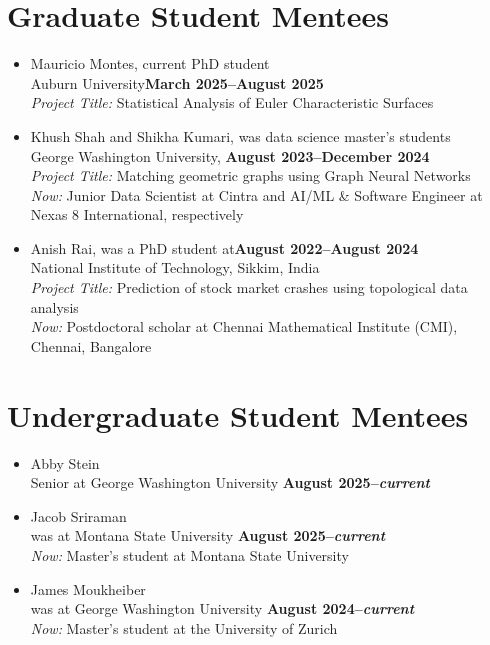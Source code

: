 \documentclass[11pt]{article}
\begin{document}
\section{Graduate Student Mentees}
\begin{itemize}
\item Mauricio Montes, current PhD student\\ Auburn University\hfill\textbf{\footnotesize March 2025--August 2025}\\
\emph{Project Title:} Statistical Analysis of Euler Characteristic Surfaces

\item Khush Shah and Shikha Kumari, was data science master's students\\ George Washington University, \hfill\textbf{\footnotesize August 2023--December 2024}\\
\emph{Project Title:} Matching geometric graphs using Graph Neural Networks\\
\emph{Now:} Junior Data Scientist at Cintra and AI/ML \& Software Engineer at Nexas 8 International, respectively

\item Anish Rai, was a PhD student at\hfill\textbf{\footnotesize August 2022--August 2024}\\ 
National Institute of Technology, Sikkim, India \\
\emph{Project Title:}  Prediction of stock market crashes using topological data analysis \\
\emph{Now:} Postdoctoral scholar at Chennai Mathematical Institute (CMI), Chennai, Bangalore 
\end{itemize}

\section{Undergraduate Student Mentees}
\begin{itemize}
\item Abby Stein\\ Senior at George Washington University \hfill\textbf{\footnotesize August 2025--\emph{current}} %

\item Jacob Sriraman\\ was at Montana State University \hfill\textbf{\footnotesize August 2025--\emph{current}}\\
\emph{Now:} Master's student at Montana State University

\item James Moukheiber\\ was at George Washington University \hfill\textbf{\footnotesize August 2024--\emph{current}}\\
\emph{Now:} Master's student at the University of Zurich

\end{itemize}
\end{document}
